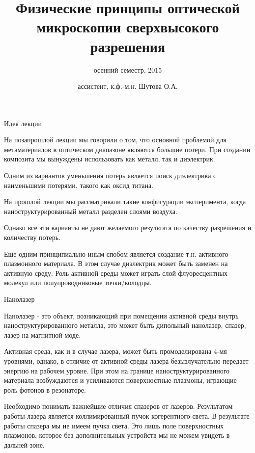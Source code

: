 \documentclass[9pt, compress, xcolor=table]{beamer}
\title{Физические принципы оптической микроскопии сверхвысокого разрешения}
\subtitle{осенний семестр, 2015}
\author{ассистент, к.ф.-м.н. Шутова О.А.}
\institute{МГУ им. М.В. Ломоносова, физический факультет}
\begin{document}
\maketitle


\begin{frame}{Идея лекции}

На позапрошлой лекции мы говорили о том, что основной проблемой для метаматериалов в оптическом диапазоне являются большие потери. При создании композита мы вынуждены использовать как металл, так и диэлектрик. 

Одним из вариантов уменьшения потерь является поиск диэлектрика с наименьшими потерями, такого как оксид титана.

На прошлой лекции мы рассматривали такие конфигурации эксперимента, когда наноструктурированный металл разделен слоями воздуха.

Однако все эти варианты не дают желаемого результата по качеству разрешения и количеству потерь.

Еще одним принципиально иным спобом является создание т.н. активного плазмонного материала. В этом случае диэлектрик может быть заменен на активную среду. Роль активной среды может играть слой флуоресцентных молекул или полупроводниковые точки/колодцы.

\end{frame}

\begin{frame}{Нанолазер}

Нанолазер - это объект, возникающий при помещении активной среды внутрь наноструктурированного металла, это может быть дипольный нанолазер, спазер, лазер на магнитной моде.

Активная среда, как и в случае лазера, может быть промоделирована 4-мя уровнями, однако, в отличие от активной среды лазера безызлучательно передает энергию на рабочем уровне. При этом на границе наноструктурированного материала возбуждаются и усиливаются поверхностные плазмоны, играющие роль фотонов в резонаторе.

Необходимо понимать важнейшие отличия спазеров от лазеров. Результатом работы лазера является коллимированный пучок когерентного света. В результате работы спазера мы не имеем пучка света. Это лишь поле поверхностных плазмонов, которое без дополнительных устройств мы не можем увидеть в дальней зоне.


\end{frame}
\end{document}
